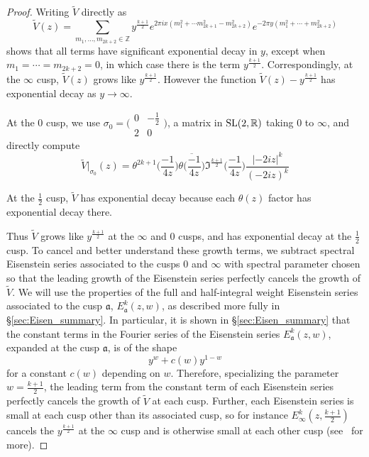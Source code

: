 \begin{proof}

Writing $\widetilde{V}$ directly as
\begin{equation}
  \widetilde{V}(z) = \sum_{m_1, \ldots, m_{2k+2} \in \mathbb{Z}} y^{\frac{k+1}{2}} e^{2\pi
  i x(m_1^2 + \cdots m_{2k+1}^2 - m_{2k+2}^2)} e^{-2\pi y(m_1^2 + \cdots + m_{2k+2}^2)}
\end{equation}
shows that all terms have significant exponential decay in $y$, except when $m_1 = \cdots
= m_{2k+2} = 0$, in which case there is the term $y^{\frac{k+1}{2}}$.
Correspondingly, at the $\infty$ cusp, $\widetilde{V}(z)$ grows like $y^{\frac{k+1}{2}}$.
However the function $\widetilde{V}(z) - y^{\frac{k+1}{2}}$ has exponential decay as $y
\to \infty$.


At the $0$ cusp, we use $\sigma_0 = \Big(\begin{smallmatrix} 0&-\frac{1}{2} \\ 2&0
\end{smallmatrix}\Big)$, a matrix in $\operatorname{SL}(2, \mathbb{R})$ taking $0$ to $\infty$, and
directly compute
\begin{equation}
  \widetilde{V}\big|_{\sigma_0}(z) = \theta^{2k+1}\Big(\frac{-1}{4z}\Big)
  \overline{\theta\Big(\frac{-1}{4z}\Big)} \Im^{\frac{k+1}{2}} \Big(\frac{-1}{4z}\Big)
  \frac{\lvert -2iz \rvert^k}{(-2iz)^k}
\end{equation}


At the $\tfrac{1}{2}$ cusp, $\widetilde{V}$ has exponential decay because each $\theta(z)$
factor has exponential decay there.


Thus $\widetilde{V}$ grows like $y^{\frac{k+1}{2}}$ at the $\infty$ and $0$ cusps, and has
exponential decay at the $\frac{1}{2}$ cusp.
To cancel and better understand these growth terms, we subtract spectral Eisenstein series
associated to the cusps $0$ and $\infty$ with spectral parameter chosen so that the
leading growth of the Eisenstein series perfectly cancels the growth of $\widetilde{V}$.
We will use the properties of the full and half-integral weight Eisenstein series
associated to the cusp $\mathfrak{a}$, $E_\mathfrak{a}^k(z,w)$, as described more fully in
\S\ref{sec:Eisen_summary}.
In particular, it is shown in \S\ref{sec:Eisen_summary} that the constant terms in the
Fourier series of the Eisenstein series $E_\mathfrak{a}^k(z,w)$, expanded at the cusp
$\mathfrak{a}$, is of the shape
\begin{equation}
  y^w + c(w)y^{1-w}
\end{equation}
for a constant $c(w)$ depending on $w$.
Therefore, specializing the parameter $w = \frac{k+1}{2}$, the leading term from the
constant term of each Eisenstein series perfectly cancels the growth of $\widetilde{V}$ at
each cusp.
Further, each Eisenstein series is small at each cusp other than its associated cusp, so
for instance $E^k_\infty(z, \tfrac{k+1}{2})$ cancels the $y^{\frac{k+1}{2}}$ at the
$\infty$ cusp and is otherwise small at each other cusp (see~\cite{Iwaniec97} for more).




\end{proof}
